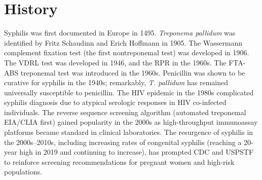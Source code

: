 \section*{History}
Syphilis was first documented in Europe in 1495. \textit{Treponema pallidum} was identified by Fritz Schaudinn and Erich Hoffmann in 1905. The Wassermann complement fixation test (the first nontreponemal test) was developed in 1906. The VDRL test was developed in 1946, and the RPR in the 1960s. The FTA-ABS treponemal test was introduced in the 1960s. Penicillin was shown to be curative for syphilis in the 1940s; remarkably, \textit{T. pallidum} has remained universally susceptible to penicillin. The HIV epidemic in the 1980s complicated syphilis diagnosis due to atypical serologic responses in HIV co-infected individuals. The reverse sequence screening algorithm (automated treponemal EIA/CLIA first) gained popularity in the 2000s as high-throughput immunoassay platforms became standard in clinical laboratories. The resurgence of syphilis in the 2000s--2010s, including increasing rates of congenital syphilis (reaching a 20-year high in 2019 and continuing to increase), has prompted CDC and USPSTF to reinforce screening recommendations for pregnant women and high-risk populations.

